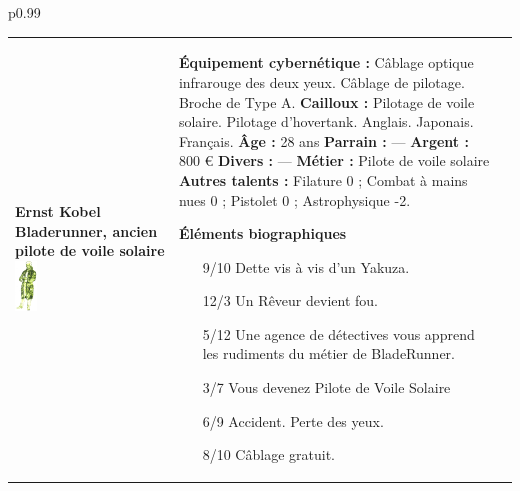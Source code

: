 \documentclass[11pt,twoside,a4paper]{article}
\begin{document}
\begin{longtable}[ht]{ p{} }
		\hline 
	\endfirsthead
		\hline
	\endhead
		\hline
	\endfoot
		\hline
	\endlastfoot
	\begin{tabular}[h]{ p{} p{} p{} }
		\textbf{Ernst Kobel}										\newline
		\textbf{\small Bladerunner, ancien pilote de voile solaire}	\newline
			\newline
		\includegraphics[width=0.15\textwidth]{img/personnageErnstKobel.jpg}
			\newline
		
		& %
			
		\textbf{{\'E}quipement cybern{\'e}tique : }C{\^a}blage optique infrarouge des deux yeux. C{\^a}blage de pilotage. Broche de Type A. \newline
		\textbf{Cailloux : }Pilotage de voile solaire. Pilotage d'hovertank. Anglais. Japonais. Fran\c{c}ais. \newline
		\textbf{{\^A}ge : } 28 ans 											\newline
		\textbf{Parrain : } --- 											\newline
		\textbf{Argent : } 800 \euro 										\newline
		\textbf{Divers : } ---												\newline
		\textbf{M{\'e}tier : } Pilote de voile solaire						\newline
		\textbf{Autres talents : } Filature 0 ; Combat {\`a} mains nues 0 ; Pistolet 0 ; Astrophysique -2. \newline
		
		\textbf{{\'E}l{\'e}ments biographiques}
		\begin{itemize}
			\item[9/10] Dette vis {\`a} vis d'un Yakuza. 
			\item[12/3] Un R{\^e}veur devient fou. 
			\item[5/12] Une agence de d{\'e}tectives vous apprend les rudiments du m{\'e}tier de BladeRunner. 
			\item[3/7] Vous devenez Pilote de Voile Solaire
			\item[6/9] Accident. Perte des yeux. 
			\item[8/10] C{\^a}blage gratuit. 
		\end{itemize}
		

\end{tabular}
\end{longtable}
\end{document}
